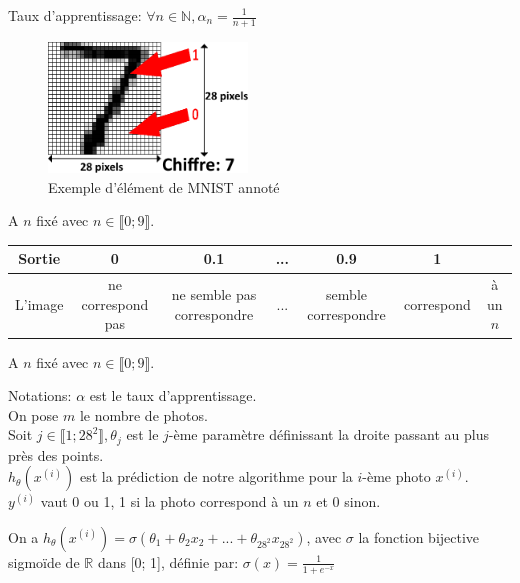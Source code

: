 \documentclass{beamer}
\begin{document}
	\newpage
	
	\vspace*{\fill}
	Taux d'apprentissage:
\LARGE$\forall n \in \mathbb{N}, \alpha_n = \frac{1}{n + 1}$
\vspace*{\fill}

\newpage

\begin{figure}
	\centering
			\includegraphics[width=150pt]{pictures/mnist.png}
		\caption{Exemple d'élément de MNIST annoté}
	\end{figure}
	
\normalsize A $n$ fixé avec $n \in \llbracket 0; 9\rrbracket$.
{\fontsize{6}{7}\selectfont
\begin{center}
	\begin{tabular}{ |c||c|c|c|c|c|c| } 
	 \hline
	 Sortie & 0 & 0.1 & ... & 0.9 & 1 &\\ 
	\hline
	 L'image & ne correspond pas & ne semble pas correspondre & ... & semble correspondre & correspond & à un $n$\\
	 \hline
	\end{tabular}
\end{center}}

	\newpage
	
	\normalsize
	A $n$ fixé avec $n \in \llbracket 0; 9\rrbracket$.
	
	\vspace{0.3cm}Notations: $\alpha$ est le taux d'apprentissage.\\
	On pose $m$ le nombre de photos.\\
	Soit $j \in \llbracket 1; 28^2 \rrbracket, \theta_j$ est le $j$-ème paramètre définissant la droite passant au plus près des points.\\
	$h_\theta(x^{(i)})$ est la prédiction de notre algorithme pour la $i$-ème photo $x^{(i)}$.\\
	$y^{(i)}$ vaut 0 ou 1, 1 si la photo correspond à un $n$ et 0 sinon.
	
	\vspace{0.3cm}On a $h_\theta(x^{(i)}) = \sigma(\theta_1 + \theta_2 x_2 + ... + \theta_{28^2} x_{28^2})$, avec $\sigma$ la fonction bijective sigmoïde de $\mathbb{R}$ dans [0; 1], définie par: $\sigma(x) = \frac{1}{1 + e^{-x}}$
	
\end{document}
